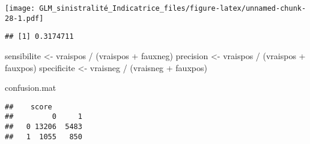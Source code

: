 \documentclass[
]{article}
\newenvironment{Shaded}{\begin{snugshade}}{\end{snugshade}}
\newcommand{\AttributeTok}[1]{\textcolor[rgb]{0.77,0.63,0.00}{#1}}
\newcommand{\DecValTok}[1]{\textcolor[rgb]{0.00,0.00,0.81}{#1}}
\newcommand{\FunctionTok}[1]{\textcolor[rgb]{0.00,0.00,0.00}{#1}}
\newcommand{\NormalTok}[1]{#1}
\newcommand{\OtherTok}[1]{\textcolor[rgb]{0.56,0.35,0.01}{#1}}
\newcommand{\SpecialCharTok}[1]{\textcolor[rgb]{0.00,0.00,0.00}{#1}}
\newcommand{\StringTok}[1]{\textcolor[rgb]{0.31,0.60,0.02}{#1}}
\begin{document}
\texttt{[image: GLM\_sinistralité\_Indicatrice\_files/figure-latex/unnamed-chunk-28-1.pdf]}

\begin{Shaded}
\end{Shaded}

\begin{verbatim}
## [1] 0.3174711
\end{verbatim}

\begin{Shaded}
\begin{Highlighting}[]
\NormalTok{sensibilite }\OtherTok{\textless{}{-}}\NormalTok{ vraispos }\SpecialCharTok{/}\NormalTok{ (vraispos }\SpecialCharTok{+}\NormalTok{ fauxneg)   }
\NormalTok{precision }\OtherTok{\textless{}{-}}\NormalTok{ vraispos }\SpecialCharTok{/}\NormalTok{ (vraispos }\SpecialCharTok{+}\NormalTok{ fauxpos) }
\NormalTok{specificite }\OtherTok{\textless{}{-}}\NormalTok{ vraisneg }\SpecialCharTok{/}\NormalTok{ (vraisneg }\SpecialCharTok{+}\NormalTok{ fauxpos)}

\NormalTok{confusion.mat}
\end{Highlighting}
\end{Shaded}

\begin{verbatim}
##    score
##         0     1
##   0 13206  5483
##   1  1055   850
\end{verbatim}
\end{document}
